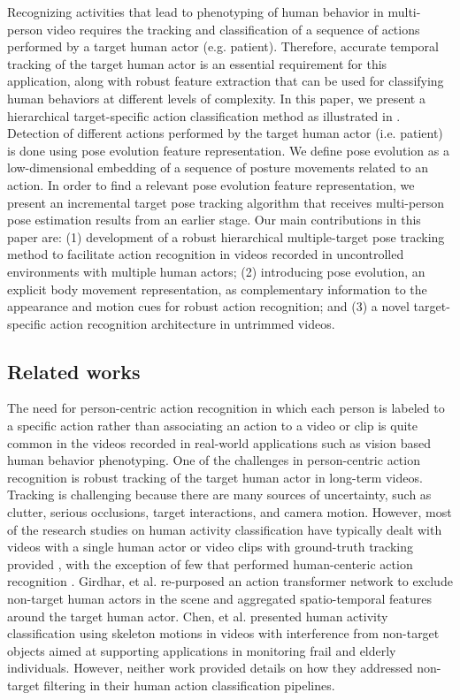 Recognizing activities that lead to phenotyping of human behavior in multi-person video requires the tracking and classification of a sequence of actions performed by a target human actor (e.g. patient). Therefore, accurate temporal tracking of the target human actor is an essential requirement for this application, along with robust feature extraction that can be used for classifying human behaviors at different levels of complexity. In this paper, we present a hierarchical target-specific action classification method as illustrated in . Detection of different actions performed by the target human actor (i.e. patient) is done using pose evolution feature representation. We define pose evolution as a low-dimensional embedding of a sequence of posture movements related to an action. In order to find a relevant pose evolution feature representation, we present an incremental target pose tracking algorithm that receives multi-person pose estimation results from an earlier stage. Our main contributions in this paper are: (1) development of a robust hierarchical multiple-target pose tracking method to facilitate action recognition in videos recorded in uncontrolled environments with multiple human actors; (2) introducing pose evolution, an explicit body movement representation, as complementary information to the appearance and motion cues for robust action recognition; and (3) a novel target-specific action recognition architecture in untrimmed videos.

\subsection{Related works}
\MethodOverview
The need for person-centric action recognition in which each person is labeled to a specific action rather than associating an action to a video or clip is quite common in the videos recorded in real-world applications such as vision based human behavior phenotyping. One of the challenges in person-centric action recognition is robust tracking of the target human actor in long-term videos. Tracking is challenging because there are many sources of uncertainty, such as clutter, serious occlusions, target interactions, and camera motion. However, most of the research studies on human activity classification have typically dealt with videos with a single human actor or video clips with ground-truth tracking provided \cite{dawar2018data}, with the exception of few that performed human-centeric action recognition \cite{girdhar2018video,chen2018robust}. Girdhar, et al. \cite{girdhar2018video} re-purposed an action transformer network to exclude non-target human actors in the scene and aggregated spatio-temporal features around the target human actor. Chen, et al. \cite{chen2018robust} presented human activity classification using skeleton motions in videos with interference from non-target objects aimed at supporting applications in monitoring frail and elderly individuals. However, neither work provided details on how they addressed non-target filtering in their human action classification pipelines. 

